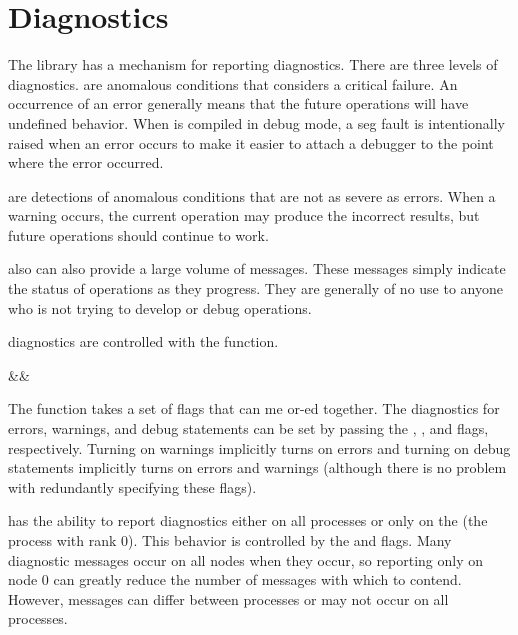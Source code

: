 

\section{Diagnostics}
\label{sec:Basic_Usage:Diagnostics}


The \IceT library has a mechanism for reporting diagnostics.  There are
three levels of diagnostics.   are anomalous
conditions that \IceT considers a critical failure.  An occurrence of an
error generally means that the future \IceT operations will have undefined
behavior.  When \IceT is compiled in debug mode, a seg fault is
intentionally raised when an error occurs to make it easier to attach a
debugger to the point where the error occurred.

 are detections of anomalous conditions
that are not as severe as errors.  When a warning occurs, the current
operation may produce the incorrect results, but future operations should
continue to work.

\IceT also can also provide a large volume of 
messages.  These messages simply indicate the status of \IceT operations as
they progress.  They are generally of no use to anyone who is not trying to
develop or debug \IceT operations.

\IceT diagnostics are controlled with the  function.

\begin{Table}{3}
  \textC{(}&&\quad\textC{);}
\end{Table}

The  function takes a set of flags that can me or-ed
together.  The diagnostics for errors, warnings, and debug statements can
be set by passing the ,
, and  flags, respectively.
Turning on warnings implicitly turns on errors and turning on debug
statements implicitly turns on errors and warnings (although there is no
problem with redundantly specifying these flags).

\IceT has the ability to report diagnostics either on all processes or only
on the  (the process with rank
0).  This behavior is controlled by the  and
 flags.  Many diagnostic messages occur on
all nodes when they occur, so reporting only on node 0 can greatly reduce
the number of messages with which to contend.  However, messages can differ
between processes or may not occur on all processes.

